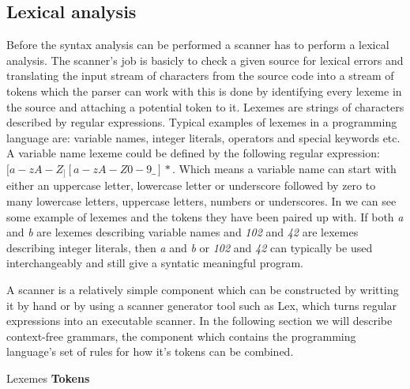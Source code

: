 \subsection{Lexical analysis}
\label{sec:lexicalanalysis}
Before the syntax analysis can be performed a scanner has to perform a lexical analysis. The scanner's job is basicly to check a given source for lexical errors and translating the input stream of characters from the source code into a stream of tokens which the parser can work with \cite[p. 57]{fischer2009} this is done by identifying every lexeme in the source and attaching a potential token to it. Lexemes are strings of characters described by regular expressions. Typical examples of lexemes in a programming language are: variable names, integer literals, operators and special keywords etc. A variable name lexeme could be defined by the following regular expression: $[a-zA-Z_][a-zA-Z0-9\_]*$. Which means a variable name can start with either an uppercase letter, lowercase letter or underscore followed by zero to many lowercase letters, uppercase letters, numbers or underscores. In  we can see some example of lexemes and the tokens they have been paired up with. If both \textit{a} and \textit{b} are lexemes describing variable names and \textit{102} and \textit{42} are lexemes describing integer literals, then \textit{a} and \textit{b} or \textit{102} and \textit{42} can typically be used interchangeably and still give a syntatic meaningful program. 

A scanner is a relatively simple component which can be constructed by writting it by hand or by using a scanner generator tool such as Lex, which turns regular expressions into an executable scanner. In the following section we will describe context-free grammars, the component which contains the programming language's set of rules for how it's tokens can be combined. 

		    {               }
{Lexemes   }{\textbf{Tokens}} {
}